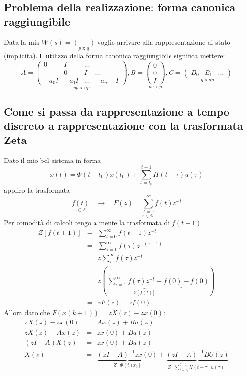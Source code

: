 \documentclass{article}
\begin{document}
\subsection{Problema della realizzazione: forma canonica raggiungibile}
Data la mia $W(s)= \underset{p\text{ x }q}{\begin{pmatrix}    &    \end{pmatrix}}$ voglio arrivare alla
rappresentazione di stato (implicita). L'utilizzo della forma canonica raggiungibile significa mettere:
\[  A = \underset{np \text{ x }np}{\begin{pmatrix}
    0 & I & ... \\
     & 0 & I &... \\
    -a_0I & -a_1I  &...&-a_{n-1}I 
    \end{pmatrix}},
    B = \underset{np \text{ x }p}{\begin{pmatrix}
        0\\
        0\\
        I
    \end{pmatrix}},
    C= \underset{q \text{ x }np}{\begin{pmatrix}
        B_0 & B_1 & ...
    \end{pmatrix}}
\]





\subsection{Come si passa da rappresentazione a tempo discreto a rappresentazione con la trasformata Zeta}

Dato il mio bel sistema in forma
\[
    x(t) = \Phi(t-t_0)x(t_0)+\sum_{t=t_0}^{t-1}H(t-\tau)u(\tau)
\]
applico la trasformata
\[
    \underset{t\in\mathbb{Z}}{f(t)}\quad\to\quad
    \underset{z\in\mathbb{C}}{F(z)=\sum_{t=0}^{\infty}f(t)z^{-t}}
\]
Per comodità di calcoli tengo a mente la trasformata di $f(t+1)$
\begin{align*}
    Z[f(t+1)] &=&\sum_{t=0}^{\infty}f(t+1)z^{-t}\\
    &=&\sum_{\tau=1}^{\infty}f(\tau)z^{-(\tau-1)}\\
    &=&z\sum_{\tau}^{\infty}f(\tau)z^{-t}\\
    &=&z\left( \underbrace{\sum_{\tau=1}^{\infty}f(\tau) z^{-t}+f(0)}_{Z[f(t)]}-f(0) \right)\\
    &=&zF(z)-zf(0)
\end{align*}
Allora dato che $F(x(k+1)) = zX(z)-zx(0)$:
\begin{align*}
    zX(z)-zx(0) &=& Ax(z)+Bu(z)\\
    zX(z)-Ax(z) &=& zx(0)+Bu(z)\\
    (zI-A)X(z) &=& zx(0)+Bu(z)\\
    X(z) &=& \underbrace{(zI-A)^{-1}zx(0)}_{Z[\Phi(t)x_0]}+
    \underbrace{(zI-A)^{-1}BU(z)}_{Z[\sum_{t=t_0}^{t-1}H(t-\tau)u(\tau)]}
\end{align*}
\end{document}
